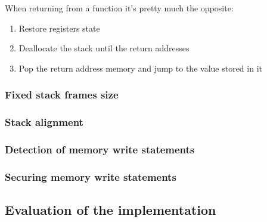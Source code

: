 \documentclass[11pt]{sdm}
\begin{document}
When returning from a function it's pretty much the opposite:
\begin{enumerate}
	\item Restore registers state
	\item Deallocate the stack until the return addresses
	\item Pop the return address memory and jump to the value stored in it
\end{enumerate}




\subsubsection{Fixed stack frames size}
\label{sub:Fixed stack frames size}

\subsubsection{Stack alignment}
\label{ssub:Stack alignment}

\subsubsection{Detection of memory write statements}
\label{ssub:Detection of memory write statements}

\subsubsection{Securing memory write statements}
\label{ssub:Securing memory write statements}

\subsection{Evaluation of the implementation}
\label{sub:Evaluation of the implementation}
\end{document}
